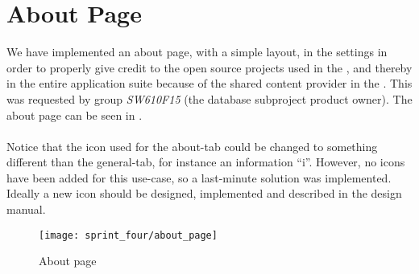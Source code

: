 
\section{About Page}
\label{sec:about_page}

We have implemented an about page, with a simple layout, in the \launcher settings in order to properly give credit to the open source projects used in the \launcher, and thereby in the entire \giraf application suite because of the shared content provider in the \launcher. This was requested by group \emph{SW610F15} (the database subproject product owner). The about page can be seen in .
\\\\
Notice that the icon used for the about-tab could be changed to something different than the general-tab, for instance an information ``i''. However, no icons have been added for this use-case, so a last-minute solution was implemented. Ideally a new icon should be designed, implemented and described in the design manual.

\begin{figure}[!htbp]
	\centering
	\texttt{[image: sprint\_four/about\_page]}
	\caption{About page}
	\label{fig:about_page}
\end{figure}
